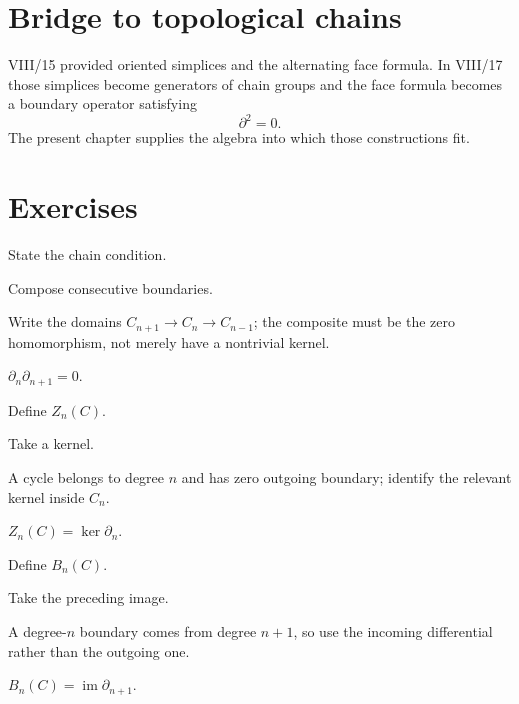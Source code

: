 \section{Bridge to topological chains}

VIII/15 provided oriented simplices and the alternating face formula.  In
VIII/17 those simplices become generators of chain groups and the face formula
becomes a boundary operator satisfying
\[
\partial^2=0.
\]
The present chapter supplies the algebra into which those constructions fit.


\section{Exercises}

\begin{exercise}\label{exr:viii16-01}
State the chain condition.
\end{exercise}
\begin{hint}
Compose consecutive boundaries.

Write the domains \(C_{n+1}\to C_n\to C_{n-1}\); the composite must be the zero homomorphism, not merely have a nontrivial kernel.
\end{hint}
\begin{solution}
\(\partial_n\partial_{n+1}=0\).
\end{solution}

\begin{exercise}\label{exr:viii16-02}
Define \(Z_n(C)\).
\end{exercise}
\begin{hint}
Take a kernel.

A cycle belongs to degree \(n\) and has zero outgoing boundary; identify the relevant kernel inside \(C_n\).
\end{hint}
\begin{solution}
\(Z_n(C)=\ker\partial_n\).
\end{solution}

\begin{exercise}\label{exr:viii16-03}
Define \(B_n(C)\).
\end{exercise}
\begin{hint}
Take the preceding image.

A degree-\(n\) boundary comes from degree \(n+1\), so use the incoming differential rather than the outgoing one.
\end{hint}
\begin{solution}
\(B_n(C)=\operatorname{im}\partial_{n+1}\).
\end{solution}

